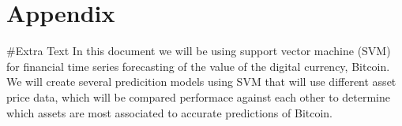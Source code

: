 \appendix

\section{Appendix}

#Extra Text
In this document we will be using support vector machine (SVM) for financial time series forecasting of the value of the digital currency, Bitcoin. We will create several predicition models using SVM that will use different asset price data, which will be compared performace against each other to determine which assets are most associated to accurate predictions of Bitcoin.  


